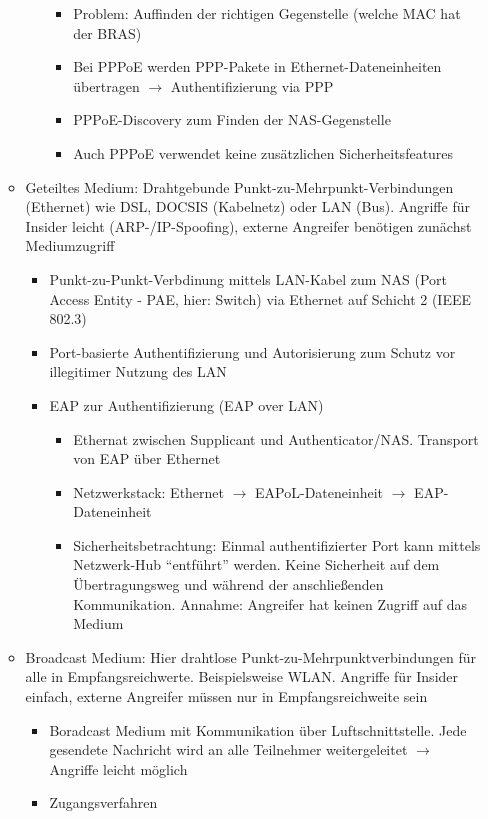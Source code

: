 \begin{itemize}
\begin{itemize}
\begin{itemize}
\begin{itemize}
				\item Problem: Auffinden der richtigen Gegenstelle (welche MAC hat der BRAS)
				\item Bei PPPoE werden PPP-Pakete in Ethernet-Dateneinheiten übertragen \(\rightarrow\) Authentifizierung via PPP
				\item PPPoE-Discovery zum Finden der NAS-Gegenstelle
				\item Auch PPPoE verwendet keine zusätzlichen Sicherheitsfeatures
			\end{itemize}
		\end{itemize}
		\item Geteiltes Medium: Drahtgebunde Punkt-zu-Mehrpunkt-Verbindungen (Ethernet) wie DSL, DOCSIS (Kabelnetz) oder LAN (Bus). Angriffe für Insider leicht (ARP-/IP-Spoofing), externe Angreifer benötigen zunächst Mediumzugriff
		\begin{itemize}
			\item Punkt-zu-Punkt-Verbdinung mittels LAN-Kabel zum NAS (Port Access Entity - PAE, hier: Switch) via Ethernet auf Schicht 2 (IEEE 802.3)
			\item Port-basierte Authentifizierung und Autorisierung zum Schutz vor illegitimer Nutzung des LAN
			\item EAP zur Authentifizierung (EAP over LAN)
			\begin{itemize}
				\item Ethernat zwischen Supplicant und Authenticator/NAS. Transport von EAP über Ethernet
				\item Netzwerkstack: Ethernet \(\rightarrow\) EAPoL-Dateneinheit \(\rightarrow\) EAP-Dateneinheit
				\item Sicherheitsbetrachtung: Einmal authentifizierter Port kann mittels Netzwerk-Hub "`entführt"' werden. Keine Sicherheit auf dem Übertragungsweg und während der anschließenden Kommunikation. Annahme: Angreifer hat keinen Zugriff auf das Medium
			\end{itemize}
		\end{itemize}
		\item Broadcast Medium: Hier drahtlose Punkt-zu-Mehrpunktverbindungen für alle in Empfangsreichwerte. Beispielsweise WLAN. Angriffe für Insider einfach, externe Angreifer müssen nur in Empfangsreichweite sein
		\begin{itemize}
			\item Boradcast Medium mit Kommunikation über Luftschnittstelle. Jede gesendete Nachricht wird an alle Teilnehmer weitergeleitet \(\rightarrow\) Angriffe leicht möglich
			\item Zugangsverfahren

\end{itemize}
\end{itemize}
\end{itemize}

